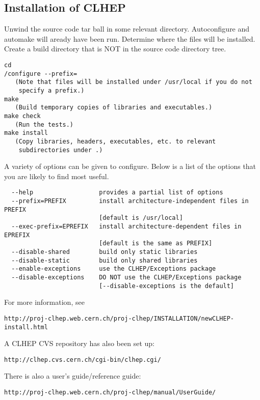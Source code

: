 \subsection{Installation of CLHEP}
Unwind the source code tar ball in some relevant directory.
Autoconfigure and automake will aready have been run.  
Determine where the files will be installed.
Create a build directory that is NOT in the source code directory tree.
\begin{lstlisting}
cd 
/configure --prefix=
   (Note that files will be installed under /usr/local if you do not 
    specify a prefix.)
make
   (Build temporary copies of libraries and executables.)
make check
   (Run the tests.)
make install
   (Copy libraries, headers, executables, etc. to relevant 
    subdirectories under .)
\end{lstlisting}
A variety of options can be given to configure.  Below is a list 
of the options that you are likely to find most useful.
\begin{lstlisting}
  --help                  provides a partial list of options
  --prefix=PREFIX         install architecture-independent files in PREFIX
                          [default is /usr/local]
  --exec-prefix=EPREFIX   install architecture-dependent files in EPREFIX
                          [default is the same as PREFIX]
  --disable-shared        build only static libraries
  --disable-static        build only shared libraries   
  --enable-exceptions     use the CLHEP/Exceptions package
  --disable-exceptions    DO NOT use the CLHEP/Exceptions package
                          [--disable-exceptions is the default] 
\end{lstlisting}
For more information, see
\begin{lstlisting}
http://proj-clhep.web.cern.ch/proj-clhep/INSTALLATION/newCLHEP-install.html
\end{lstlisting}
A CLHEP CVS repository has also been set up:
\begin{lstlisting}
http://clhep.cvs.cern.ch/cgi-bin/clhep.cgi/
\end{lstlisting}
There is also a user's guide/reference guide:
\begin{lstlisting}
http://proj-clhep.web.cern.ch/proj-clhep/manual/UserGuide/
\end{lstlisting}

